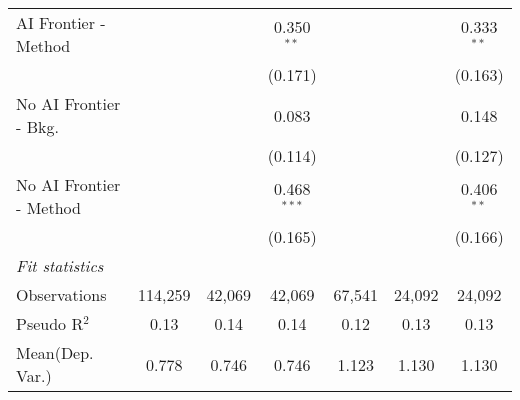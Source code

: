 \begin{tabular}{lcccccc}
   AI Frontier - Method    &               &               & 0.350$^{**}$  &               &               & 0.333$^{**}$\\   
                           &               &               & (0.171)       &               &               & (0.163)\\   
   No AI Frontier - Bkg.   &               &               & 0.083         &               &               & 0.148\\   
                           &               &               & (0.114)       &               &               & (0.127)\\   
   No AI Frontier - Method &               &               & 0.468$^{***}$ &               &               & 0.406$^{**}$\\   
                           &               &               & (0.165)       &               &               & (0.166)\\   
   \midrule
   \emph{Fit statistics}\\
   Observations            & 114,259       & 42,069        & 42,069        & 67,541        & 24,092        & 24,092\\  
   Pseudo R$^2$            & 0.13          & 0.14          & 0.14          & 0.12          & 0.13          & 0.13\\  
Mean(Dep. Var.) & 0.778 & 0.746 & 0.746 & 1.123 & 1.130 & 1.130 \\
   

\end{tabular}

